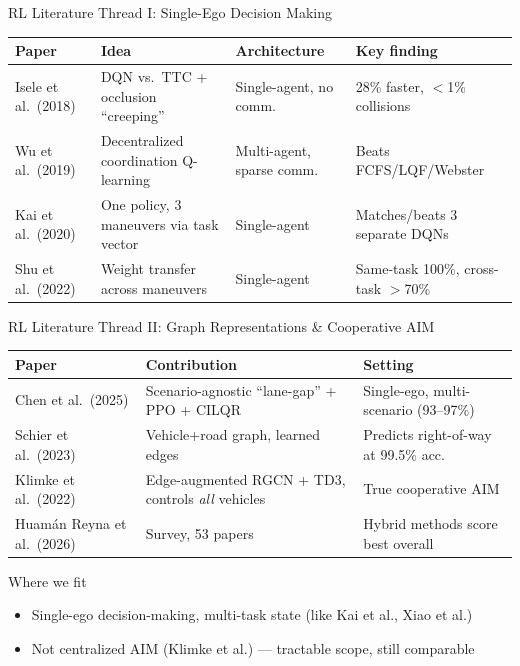 \documentclass[aspectratio=169,10pt]{beamer}
\begin{document}
\begin{frame}{RL Literature Thread I: Single-Ego Decision Making}
	\scriptsize
	\begin{table}
		\begin{tabularx}{\textwidth}{@{}l X X X@{}}
			\toprule
			\textbf{Paper}       & \textbf{Idea}                           & \textbf{Architecture}     & \textbf{Key finding}                \\
			\midrule
			Isele et al.\ (2018) & DQN vs.\ TTC + occlusion ``creeping''   & Single-agent, no comm.    & 28\% faster, $<$1\% collisions      \\
			Wu et al.\ (2019)    & Decentralized coordination Q-learning   & Multi-agent, sparse comm. & Beats FCFS/LQF/Webster              \\
			Kai et al.\ (2020)   & One policy, 3 maneuvers via task vector & Single-agent              & Matches/beats 3 separate DQNs       \\
			Shu et al.\ (2022)   & Weight transfer across maneuvers        & Single-agent              & Same-task 100\%, cross-task $>$70\% \\
			\bottomrule
		\end{tabularx}
	\end{table}
\end{frame}

\begin{frame}{RL Literature Thread II: Graph Representations \& Cooperative AIM}
	\scriptsize
	\begin{table}
		\begin{tabularx}{\textwidth}{@{}l X X@{}}
			\toprule
			\textbf{Paper}              & \textbf{Contribution}                                   & \textbf{Setting}                      \\
			\midrule
			Chen et al.\ (2025)         & Scenario-agnostic ``lane-gap'' + PPO + CILQR            & Single-ego, multi-scenario (93--97\%) \\
			Schier et al.\ (2023)       & Vehicle+road graph, learned edges                       & Predicts right-of-way at 99.5\% acc.  \\
			Klimke et al.\ (2022)       & Edge-augmented RGCN + TD3, controls \emph{all} vehicles & True cooperative AIM          \\
			Huamán Reyna et al.\ (2026) & Survey, 53 papers                                       & Hybrid methods score best overall     \\
			\bottomrule
		\end{tabularx}
	\end{table}
	\vspace{8pt}
	\begin{block}{Where we fit}
		\small
		\begin{itemize}
			\item Single-ego decision-making, multi-task state (like Kai et al., Xiao et al.)
			\item Not centralized AIM (Klimke et al.) --- tractable scope, still comparable
		\end{itemize}
	\end{block}
\end{frame}
\end{document}

